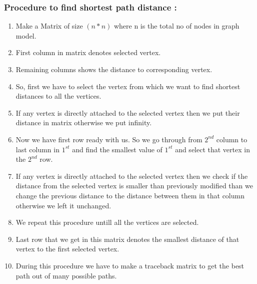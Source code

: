\documentclass{article}
\begin{document}
        \subsubsection{Procedure to find shortest path distance :}
        \begin{enumerate}
            \item Make a Matrix of size $( n * n )$ where n is the total no of nodes in graph model.
            \item First column in matrix denotes selected vertex.
            \item Remaining columns shows the distance to corresponding vertex.
            \item So, first we have to select the vertex from which we want to find shortest distances to all the vertices.
            \item If any vertex is directly attached to the selected vertex then we put their distance in matrix otherwise we put infinity.
            \item Now we have first row ready with us. So we go through from $2^{nd}$ column to last column in $1^{st}$ and find the smallest value of $1^{st}$ and select that vertex in the $2^{nd}$ row.
            \item If any vertex is directly attached to the selected vertex then we check if the distance from the selected vertex is smaller than previously modified than we change the previous distance to the distance between them in that column otherwise we left it unchanged.
            \item We repeat this procedure untill all the vertices are selected.
            \item Last row that we get in this matrix denotes the smallest distance of that vertex to the first selected vertex.
            \item During this procedure we have to make a traceback matrix to get the best path out of many possible paths.
            \citep{6240942}
        \end{enumerate}\newpage
\end{document}
